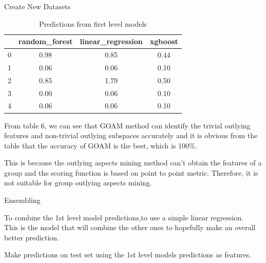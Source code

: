 \documentclass[
 size=14pt,
 paper=smartboard,  %
 mode=present, 		%
 display=slides, 	%
 style=tuliplab,  	%
 pauseslide,
 fleqn,leqno]{powerdot}
\begin{document}
  \begin{slide}[toc=,bm=]{Create New Datasets}

    \begin{table}[tb]
    \setlength{\abovecaptionskip}{0pt}
    \setlength{\belowcaptionskip}{10pt}
    \centering
    \caption{Predictions from first level models}
    
    \begin{tabular}{ c | c | c | c }
    \toprule
          &  random_forest    & linear_regression  & xgboost    \\
    \midrule
    0 &  0.98   &  0.85  &0.44   \\
    
    1 &  0.06   &  0.06 &0.10\\
    
    2 &   0.85   &  1.79 &0.50\\
    3 &   0.00   &  0.06 &0.10\\
    4 &   0.06   &  0.06 &0.10\\
    \bottomrule
    \end{tabular}
    \end{table}
    
    \begin{note}
    From table $6$,
    we can see that GOAM method can identify the trivial outlying features
    and non-trivial outlying subspaces accurately and
    it is obvious from the table that the accuracy of GOAM is the best,
    which is 100\%.
    
    This is because the outlying aspects mining method
    can't obtain the features of a group and the scoring function
    is based on point to point metric.
    Therefore,
    it is not suitable for group outlying aspects mining.
    \end{note}
    
    \end{slide}
\begin{slide}[toc=,bm=]{Ensembling}

\begin{center}
\begin{itemize}

\item
\smallskip
\large
{To combine the 1st level model predictions,to use a simple linear regression. \\
This is the model that will combine the other ones to hopefully make an overall better prediction. \\

\item
Make predictions on test set using the 1st level models predictions as features.
}

\end{itemize}
\end{center}
\end{slide}
\end{document}
